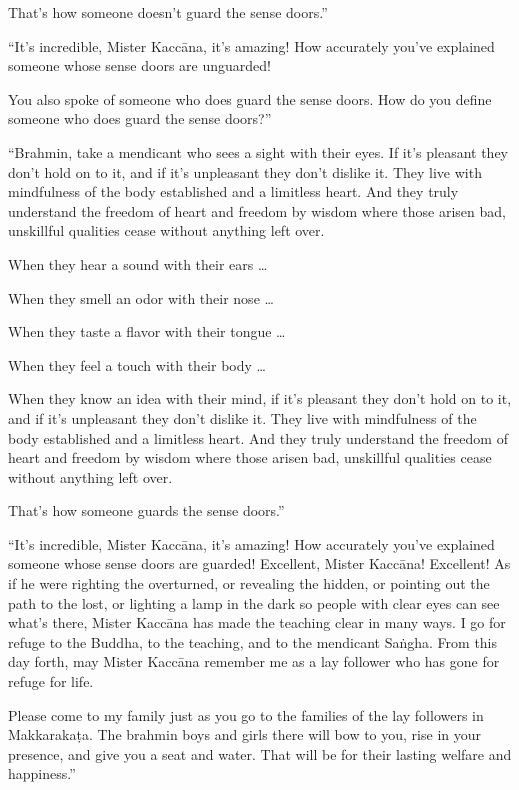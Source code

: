 \documentclass[12pt,openany]{book}%
\begin{document}
That’s how someone doesn’t guard the sense doors.” 

“It’s incredible, Mister \textsanskrit{Kaccāna}, it’s amazing! How accurately you’ve explained someone whose sense doors are unguarded! 

You also spoke of someone who does guard the sense doors. How do you define someone who does guard the sense doors?” 

“Brahmin, take a mendicant who sees a sight with their eyes. If it’s pleasant they don’t hold on to it, and if it’s unpleasant they don’t dislike it. They live with mindfulness of the body established and a limitless heart. And they truly understand the freedom of heart and freedom by wisdom where those arisen bad, unskillful qualities cease without anything left over. 

When they hear a sound with their ears … 

When they smell an odor with their nose … 

When they taste a flavor with their tongue … 

When they feel a touch with their body … 

When they know an idea with their mind, if it’s pleasant they don’t hold on to it, and if it’s unpleasant they don’t dislike it. They live with mindfulness of the body established and a limitless heart. And they truly understand the freedom of heart and freedom by wisdom where those arisen bad, unskillful qualities cease without anything left over. 

That’s how someone guards the sense doors.” 

“It’s incredible, Mister \textsanskrit{Kaccāna}, it’s amazing! How accurately you’ve explained someone whose sense doors are guarded! Excellent, Mister \textsanskrit{Kaccāna}! Excellent! As if he were righting the overturned, or revealing the hidden, or pointing out the path to the lost, or lighting a lamp in the dark so people with clear eyes can see what’s there, Mister \textsanskrit{Kaccāna} has made the teaching clear in many ways. I go for refuge to the Buddha, to the teaching, and to the mendicant \textsanskrit{Saṅgha}. From this day forth, may Mister \textsanskrit{Kaccāna} remember me as a lay follower who has gone for refuge for life. 

Please come to my family just as you go to the families of the lay followers in \textsanskrit{Makkarakaṭa}. The brahmin boys and girls there will bow to you, rise in your presence, and give you a seat and water. That will be for their lasting welfare and happiness.” 
\end{document}
